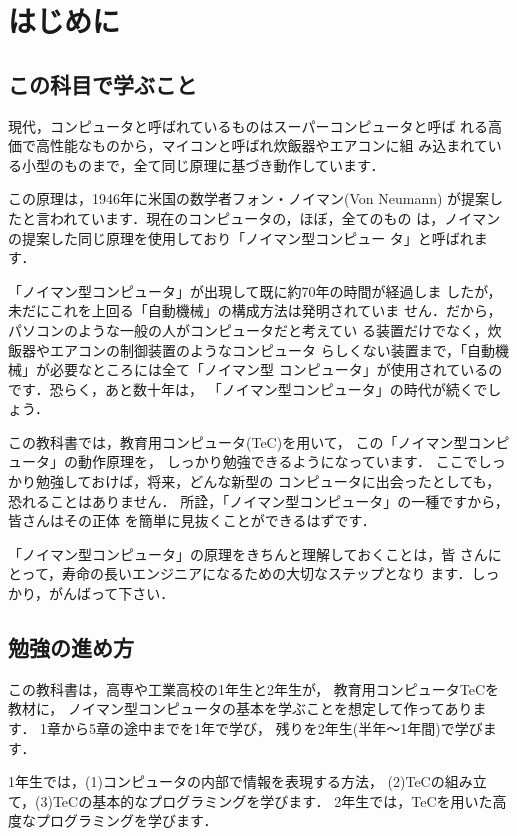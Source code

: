 \chapter{はじめに}

\section{この科目で学ぶこと}
現代，コンピュータと呼ばれているものはスーパーコンピュータと呼ば
れる高価で高性能なものから，マイコンと呼ばれ炊飯器やエアコンに組
み込まれている小型のものまで，全て同じ原理に基づき動作しています．

この原理は，1946年に米国の数学者フォン・ノイマン(Von Neumann)
が提案したと言われています．現在のコンピュータの，ほぼ，全てのもの
は，ノイマンの提案した同じ原理を使用しており「ノイマン型コンピュー
タ」と呼ばれます．

「ノイマン型コンピュータ」が出現して既に約70年の時間が経過しま
したが，未だにこれを上回る「自動機械」の構成方法は発明されていま
せん．だから，パソコンのような一般の人がコンピュータだと考えてい
る装置だけでなく，炊飯器やエアコンの制御装置のようなコンピュータ
らしくない装置まで，「自動機械」が必要なところには全て「ノイマン型
コンピュータ」が使用されているのです．恐らく，あと数十年は，
「ノイマン型コンピュータ」の時代が続くでしょう．

この教科書では，教育用コンピュータ(TeC)を用いて，
この「ノイマン型コンピュータ」の動作原理を，
しっかり勉強できるようになっています．
ここでしっかり勉強しておけば，将来，どんな新型の
コンピュータに出会ったとしても，恐れることはありません．
所詮，「ノイマン型コンピュータ」の一種ですから，皆さんはその正体
を簡単に見抜くことができるはずです．

「ノイマン型コンピュータ」の原理をきちんと理解しておくことは，皆
さんにとって，寿命の長いエンジニアになるための大切なステップとなり
ます．しっかり，がんばって下さい．

\section{勉強の進め方}

この教科書は，高専や工業高校の1年生と2年生が，
教育用コンピュータTeCを教材に，
ノイマン型コンピュータの基本を学ぶことを想定して作ってあります．
1章から5章の途中までを1年で学び，
残りを2年生(半年〜1年間)で学びます．

1年生では，(1)コンピュータの内部で情報を表現する方法，
(2)TeCの組み立て，(3)TeCの基本的なプログラミングを学びます．
2年生では，TeCを用いた高度なプログラミングを学びます．


